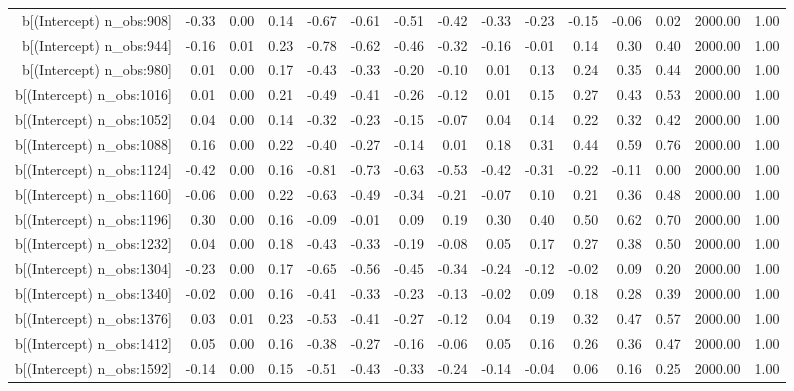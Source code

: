 \begin{table}[ht]
\begin{tabular}{rrrrrrrrrrrrrrr}
  b[(Intercept) n\_obs:908] & -0.33 & 0.00 & 0.14 & -0.67 & -0.61 & -0.51 & -0.42 & -0.33 & -0.23 & -0.15 & -0.06 & 0.02 & 2000.00 & 1.00 \\ 
  b[(Intercept) n\_obs:944] & -0.16 & 0.01 & 0.23 & -0.78 & -0.62 & -0.46 & -0.32 & -0.16 & -0.01 & 0.14 & 0.30 & 0.40 & 2000.00 & 1.00 \\ 
  b[(Intercept) n\_obs:980] & 0.01 & 0.00 & 0.17 & -0.43 & -0.33 & -0.20 & -0.10 & 0.01 & 0.13 & 0.24 & 0.35 & 0.44 & 2000.00 & 1.00 \\ 
  b[(Intercept) n\_obs:1016] & 0.01 & 0.00 & 0.21 & -0.49 & -0.41 & -0.26 & -0.12 & 0.01 & 0.15 & 0.27 & 0.43 & 0.53 & 2000.00 & 1.00 \\ 
  b[(Intercept) n\_obs:1052] & 0.04 & 0.00 & 0.14 & -0.32 & -0.23 & -0.15 & -0.07 & 0.04 & 0.14 & 0.22 & 0.32 & 0.42 & 2000.00 & 1.00 \\ 
  b[(Intercept) n\_obs:1088] & 0.16 & 0.00 & 0.22 & -0.40 & -0.27 & -0.14 & 0.01 & 0.18 & 0.31 & 0.44 & 0.59 & 0.76 & 2000.00 & 1.00 \\ 
  b[(Intercept) n\_obs:1124] & -0.42 & 0.00 & 0.16 & -0.81 & -0.73 & -0.63 & -0.53 & -0.42 & -0.31 & -0.22 & -0.11 & 0.00 & 2000.00 & 1.00 \\ 
  b[(Intercept) n\_obs:1160] & -0.06 & 0.00 & 0.22 & -0.63 & -0.49 & -0.34 & -0.21 & -0.07 & 0.10 & 0.21 & 0.36 & 0.48 & 2000.00 & 1.00 \\ 
  b[(Intercept) n\_obs:1196] & 0.30 & 0.00 & 0.16 & -0.09 & -0.01 & 0.09 & 0.19 & 0.30 & 0.40 & 0.50 & 0.62 & 0.70 & 2000.00 & 1.00 \\ 
  b[(Intercept) n\_obs:1232] & 0.04 & 0.00 & 0.18 & -0.43 & -0.33 & -0.19 & -0.08 & 0.05 & 0.17 & 0.27 & 0.38 & 0.50 & 2000.00 & 1.00 \\ 
  b[(Intercept) n\_obs:1304] & -0.23 & 0.00 & 0.17 & -0.65 & -0.56 & -0.45 & -0.34 & -0.24 & -0.12 & -0.02 & 0.09 & 0.20 & 2000.00 & 1.00 \\ 
  b[(Intercept) n\_obs:1340] & -0.02 & 0.00 & 0.16 & -0.41 & -0.33 & -0.23 & -0.13 & -0.02 & 0.09 & 0.18 & 0.28 & 0.39 & 2000.00 & 1.00 \\ 
  b[(Intercept) n\_obs:1376] & 0.03 & 0.01 & 0.23 & -0.53 & -0.41 & -0.27 & -0.12 & 0.04 & 0.19 & 0.32 & 0.47 & 0.57 & 2000.00 & 1.00 \\ 
  b[(Intercept) n\_obs:1412] & 0.05 & 0.00 & 0.16 & -0.38 & -0.27 & -0.16 & -0.06 & 0.05 & 0.16 & 0.26 & 0.36 & 0.47 & 2000.00 & 1.00 \\ 
  b[(Intercept) n\_obs:1592] & -0.14 & 0.00 & 0.15 & -0.51 & -0.43 & -0.33 & -0.24 & -0.14 & -0.04 & 0.06 & 0.16 & 0.25 & 2000.00 & 1.00 \\ 

\end{tabular}
\end{table}
